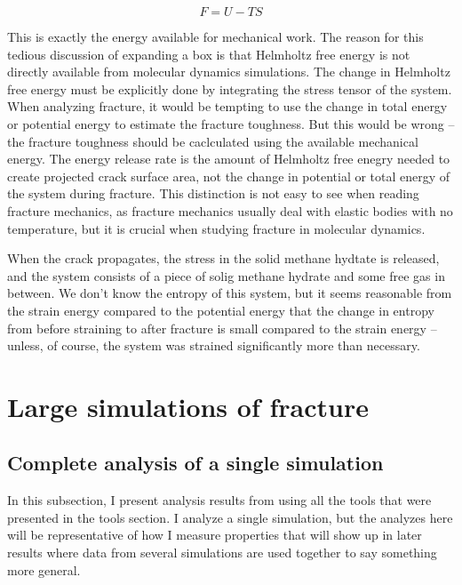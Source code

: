 \begin{equation}
	F = U - TS
\end{equation}

This is exactly the energy available for mechanical work. The reason for this tedious discussion of expanding a box is that Helmholtz free energy is not directly available from molecular dynamics simulations. The change in Helmholtz free energy must be explicitly done by integrating the stress tensor of the system. When analyzing fracture, it would be tempting to use the change in total energy or potential energy to estimate the fracture toughness. But this would be wrong -- the fracture toughness should be caclculated using the available mechanical energy. The energy release rate is the amount of Helmholtz free enegry needed to create projected crack surface area, not the change in potential or total energy of the system during fracture. This distinction is not easy to see when reading fracture mechanics, as fracture mechanics usually deal with elastic bodies with no temperature, but it is crucial when studying fracture in molecular dynamics.

When the crack propagates, the stress in the solid methane hydtate is released, and the system consists of a piece of solig methane hydrate and some free gas in between. We don't know the entropy of this system, but it seems reasonable from the strain energy compared to the potential energy that the change in entropy from before straining to after fracture is small compared to the strain energy -- unless, of course, the system was strained significantly more than necessary.


\section{Large simulations of fracture}
\subsection{Complete analysis of a single simulation}
In this subsection, I present analysis results from using all the tools that were presented in the tools section. I analyze a single simulation, but the analyzes here will be representative of how I measure properties that will show up in later results where data from several simulations are used together to say something more general.

